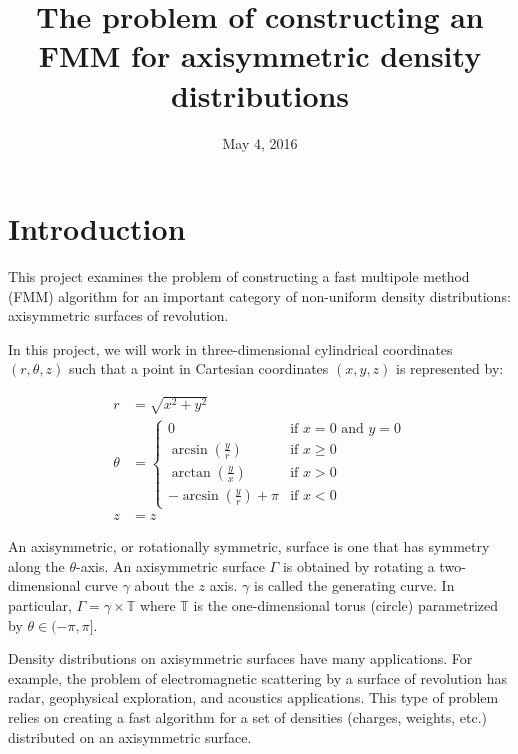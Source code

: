 \documentclass[11pt, oneside]{article}   	%
\title{The problem of constructing an FMM for axisymmetric density distributions}
\date{May 4, 2016}
\begin{document}
\maketitle

\section{Introduction}
This project examines the problem of constructing a fast multipole method (FMM) algorithm for an important category of non-uniform density distributions: axisymmetric surfaces of revolution.

In this project, we will work in three-dimensional cylindrical coordinates $(r,\theta,z)$ such that a point in Cartesian coordinates $(x,y,z)$ is represented by:

\begin{align}
r &= \sqrt{x^2+y^2}\\
\theta &=   \begin{cases}
    0 & \mbox{if } x = 0 \mbox{ and } y = 0\\
    \arcsin(\frac{y}{r}) & \mbox{if } x \geq 0 \\	
    \arctan(\frac{y}{x}) & \mbox{if } x > 0 \\	
    -\arcsin(\frac{y}{r}) + \pi & \mbox{if } x < 0
  \end{cases}\\
z &= z
\end{align}

An axisymmetric, or rotationally symmetric, surface is one that has symmetry along the $\theta$-axis. An axisymmetric surface $\Gamma$ is obtained by rotating a two-dimensional curve $\gamma$ about the $z$ axis. $\gamma$ is called the generating curve. In particular, $\Gamma=\gamma\times\mathbb{T}$ where $\mathbb{T}$ is the one-dimensional torus (circle) parametrized by $\theta\in(-\pi,\pi]$.

Density distributions on axisymmetric surfaces have many applications. For example, the problem of electromagnetic scattering by a surface of revolution has radar, geophysical exploration, and acoustics applications. This type of problem relies on creating a fast algorithm for a set of densities (charges, weights, etc.) distributed on an axisymmetric surface.
\end{document}
